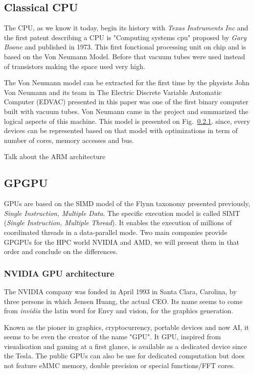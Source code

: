 \subsection{Classical CPU}

The CPU, as we know it today, begin its history with \textit{Texas Instruments Inc} and the first patent describing a CPU is "Computing systems cpu" proposed by \textit{Gary Boone} and published in 1973.
This first fonctional processing unit on chip and is based on the Von Neumann Model.
Before that vacuum tubes were used instead of transistors making the space used very high.

The Von Neumann model can be extracted for the first time by the physists John Von Neumann and its team in \cite{} 
The Electric Discrete Variable Automatic Computer (EDVAC) presented in this paper was one of the first binary computer built with vacuum tubes. Von Neumann came in the project and summarized the logical aspects of this machine. 
This model is presented on Fig.~\ref{}.
since, every devices can be represented based on that model with optimizations in term of number of cores, memory accesses and bus. 




Talk about the ARM architecture 

\subsection{GPGPU}

GPUs are based on the SIMD model of the Flynn taxonomy presented previously, \emph{Single Instruction, Multiple Data}.
The specific execution model is called SIMT (\emph{Single Instruction, Multiple Thread}). It enables the execution of millions of coordinated threads in a data-parallel mode. 
Two main companies provide GPGPUs for the HPC world NVIDIA and AMD, we will present them in that order and conclude on the differences. 

\subsubsection{NVIDIA GPU architecture}

The NVIDIA company was fonded in April 1993 in Santa Clara, Carolina, by three persons in which Jensen Huang, the actual CEO.
Its name seems to come from \textit{invidia} the latin word for Envy and vision, for the graphics generation. 

Known as the pioner in graphics, cryptocurrency, portable devices and now AI, it seems to be even the creator of the name "GPU".
It GPU, inspired from visualisation and gaming at a first glance, is available as a dedicated device  since the Tesla. 
The public GPUs can also be use for dedicated computation but does not feature eMMC memory, double precision or special functions/FFT cores. 


